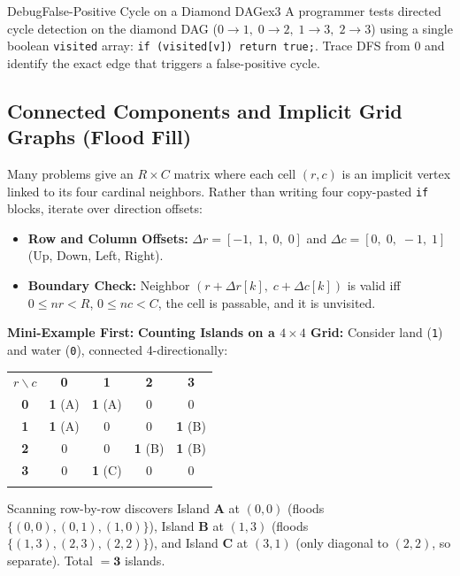 \documentclass[11pt,a4paper]{article}
\theoremstyle{definition}
\newcommand{\examplebeat}{\textbf{\color{primaryblue}Mini-Example First:} }
\begin{document}
\begin{tryitbox}{Debug}{False-Positive Cycle on a Diamond DAG}{ex3}
A programmer tests directed cycle detection on the diamond DAG ($0 \to 1,\; 0 \to 2,\; 1 \to 3,\; 2 \to 3$) using a single boolean \texttt{visited} array: \texttt{if (visited[v]) return true;}. Trace DFS from $0$ and identify the exact edge that triggers a false-positive cycle.
\end{tryitbox}

\subsection{Connected Components and Implicit Grid Graphs (Flood Fill)}

Many problems give an $R \times C$ matrix where each cell $(r, c)$ is an implicit vertex linked to its four cardinal neighbors. Rather than writing four copy-pasted \texttt{if} blocks, iterate over direction offsets:
\begin{itemize}
    \item \textbf{Row and Column Offsets:} $\Delta r = [-1,\; 1,\; 0,\; 0]$ and $\Delta c = [0,\; 0,\; -1,\; 1]$ (Up, Down, Left, Right).
    \item \textbf{Boundary Check:} Neighbor $(r + \Delta r[k],\; c + \Delta c[k])$ is valid iff $0 \le nr < R$, $0 \le nc < C$, the cell is passable, and it is unvisited.
\end{itemize}

\examplebeat \textbf{Counting Islands on a $4 \times 4$ Grid:} Consider land (\texttt{1}) and water (\texttt{0}), connected 4-directionally:
\begin{center}
\begingroup\small
\begin{tabular}{ccccc}
\arrayrulecolor{primaryblue}\toprule[1.1pt]
\rowcolor{primaryblue!10}
\textcolor{primaryblue}{\textbf{$r \backslash c$}} & \textbf{0} & \textbf{1} & \textbf{2} & \textbf{3} \\
\arrayrulecolor{codeframe}\midrule[0.6pt]
\textbf{0} & \textbf{1} (A) & \textbf{1} (A) & $0$ & $0$ \\
\textbf{1} & \textbf{1} (A) & $0$ & $0$ & \textbf{1} (B) \\
\textbf{2} & $0$ & $0$ & \textbf{1} (B) & \textbf{1} (B) \\
\textbf{3} & $0$ & \textbf{1} (C) & $0$ & $0$ \\
\arrayrulecolor{primaryblue}\bottomrule[1.1pt]
\end{tabular}
\endgroup
\end{center}
Scanning row-by-row discovers Island \textbf{A} at $(0, 0)$ (floods $\{(0,0), (0,1), (1,0)\}$), Island \textbf{B} at $(1, 3)$ (floods $\{(1,3), (2,3), (2,2)\}$), and Island \textbf{C} at $(3, 1)$ (only diagonal to $(2,2)$, so separate). Total $= \mathbf{3}$ islands.
\end{document}
